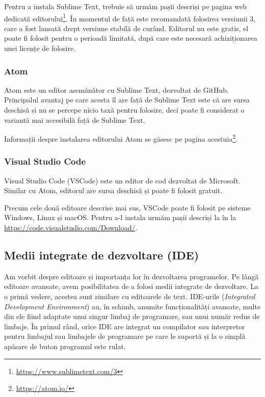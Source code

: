 Pentru a instala Sublime Text, trebuie să urmăm pașii descriși pe pagina web dedicată editorului\footnote{\url{https://www.sublimetext.com/3}}.
În momentul de față este recomandată folosirea versiunii 3, care a fost lansată drept versiune stabilă de curând.
Editorul nu este gratis, el poate fi folosit pentru o perioadă limitată, după care este necesară achiziționarea unei licențe de folosire.

\subsubsection{Atom}
\label{sec:appdev:dev:editor-gui:atom}

Atom este un editor asemănător cu Sublime Text, dezvoltat de GitHub.
Principalul avantaj pe care acesta îl are față de Sublime Text este că are sursa deschisă și nu se percepe nicio taxă pentru folosire, deci poate fi considerat o variantă mai accesibilă față de Sublime Text.

Informații despre instalarea editorului Atom se găsesc pe pagina acestuia\footnote{\url{https://atom.io/}}.

\subsubsection{Visual Studio Code}
\label{sec:appdev:dev:editor-gui:vscode}

Visual Studio Code (VSCode) este un editor de cod dezvoltat de Microsoft.
Similar cu Atom, editorul are sursa deschisă și poate fi folosit gratuit.

Precum cele două editoare descrise mai sus, VSCode poate fi folosit pe sisteme Windows, Linux și macOS.
Pentru a-l instala urmăm pașii descriși la în la \url{https://code.visualstudio.com/Download/}.

\subsection{Medii integrate de dezvoltare (IDE)}
\label{sec:appdev:dev:ide}

Am vorbit despre editoare și importanța lor în dezvoltarea programelor.
Pe lângă editoare avansate, avem posibilitatea de a folosi medii integrate de dezvoltare.
La o primă vedere, acestea sunt similare cu editoarele de text.
IDE-urile  (\textit{Integrated Development Environment}) au, în schimb, anumite funcționalități avansate, multe din ele fiind adaptate unui singur limbaj de programare, sau unui număr redus de limbaje.
În primul rând, orice IDE are integrat un compilator sau interpretor pentru limbajul sau limbajele de programare pe care le suportă și la o simplă apăsare de buton programul este rulat.


